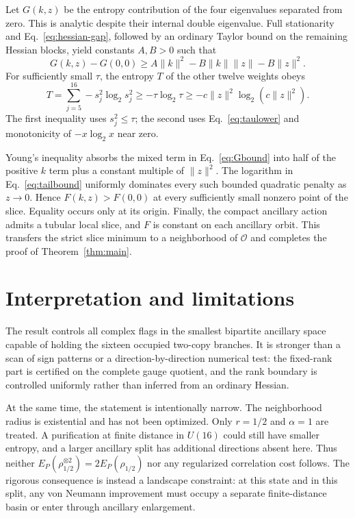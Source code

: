 \documentclass[11pt]{article}
\newcommand{\cO}{\mathcal{O}}
\begin{document}
Let $G(k,z)$ be the entropy contribution of the four eigenvalues separated
from zero.  This is analytic despite their internal double eigenvalue.  Full
stationarity and Eq.~\eqref{eq:hessian-gap}, followed by an ordinary Taylor
bound on the remaining Hessian blocks, yield constants $A,B>0$ such that
\begin{equation}
 G(k,z)-G(0,0)\geq A\lVert k\rVert^2
 -B\lVert k\rVert\lVert z\rVert-B\lVert z\rVert^2.
 \label{eq:Gbound}
\end{equation}
For sufficiently small $\tau$, the entropy $T$ of the other twelve weights
obeys
\begin{equation}
 T=\sum_{j=5}^{16}-s_j^2\log_2s_j^2
 \geq-\tau\log_2\tau
 \geq-c\lVert z\rVert^2\log_2(c\lVert z\rVert^2).
 \label{eq:tailbound}
\end{equation}
The first inequality uses $s_j^2\leq\tau$; the second uses
Eq.~\eqref{eq:taulower} and monotonicity of $-x\log_2x$ near zero.

Young's inequality absorbs the mixed term in Eq.~\eqref{eq:Gbound} into half
of the positive $k$ term plus a constant multiple of $\lVert z\rVert^2$.
The logarithm in Eq.~\eqref{eq:tailbound} uniformly dominates every such
bounded quadratic penalty as $z\to0$.  Hence $F(k,z)>F(0,0)$ at every
sufficiently small nonzero point of the slice.  Equality occurs only at its
origin.  Finally, the compact ancillary action admits a tubular local slice,
and $F$ is constant on each ancillary orbit.  This transfers the strict slice
minimum to a neighborhood of $\cO$ and completes the proof of
Theorem~\ref{thm:main}.

\section{Interpretation and limitations}

The result controls all complex flags in the smallest bipartite ancillary
space capable of holding the sixteen occupied two-copy branches.  It is
stronger than a scan of sign patterns or a direction-by-direction numerical
test: the fixed-rank part is certified on the complete gauge quotient, and
the rank boundary is controlled uniformly rather than inferred from an
ordinary Hessian.

At the same time, the statement is intentionally narrow.  The neighborhood
radius is existential and has not been optimized.  Only $r=1/2$ and
$\alpha=1$ are treated.  A purification at finite distance in $U(16)$ could
still have smaller entropy, and a larger ancillary split has additional
directions absent here.  Thus neither
$E_P(\rho_{1/2}^{\otimes2})=2E_P(\rho_{1/2})$ nor any regularized correlation
cost follows.  The rigorous consequence is instead a landscape constraint:
at this state and in this split, any von Neumann improvement must occupy a
separate finite-distance basin or enter through ancillary enlargement.
\end{document}
